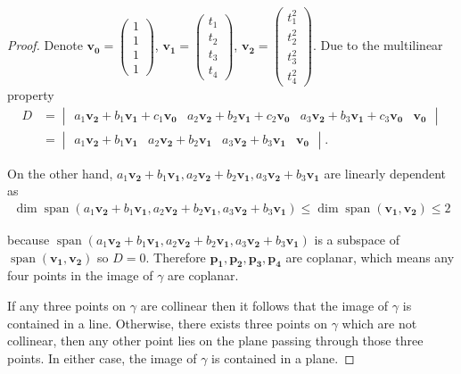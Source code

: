 \begin{proof}
	Denote $\mathbf{v_{0}} = \begin{pmatrix}1 \\ 1 \\ 1 \\ 1\end{pmatrix}$, $\mathbf{v_{1}} = \begin{pmatrix}t_{1} \\ t_{2} \\ t_{3} \\ t_{4}\end{pmatrix}$, $\mathbf{v_{2}} = \begin{pmatrix}t_{1}^{2} \\ t_{2}^{2} \\ t_{3}^{2} \\ t_{4}^{2}\end{pmatrix}$. Due to the multilinear property
	\begin{align*}
		D & = \begin{vmatrix}a_{1}\mathbf{v_{2}} + b_{1}\mathbf{v_{1}} + c_{1}\mathbf{v_{0}} & a_{2}\mathbf{v_{2}} + b_{2}\mathbf{v_{1}} + c_{2}\mathbf{v_{0}} & a_{3}\mathbf{v_{2}} + b_{3}\mathbf{v_{1}} + c_{3}\mathbf{v_{0}} & \mathbf{v_{0}}\end{vmatrix} \\
		  & = \begin{vmatrix}a_{1}\mathbf{v_{2}} + b_{1}\mathbf{v_{1}} & a_{2}\mathbf{v_{2}} + b_{2}\mathbf{v_{1}} & a_{3}\mathbf{v_{2}} + b_{3}\mathbf{v_{1}} & \mathbf{v_{0}}\end{vmatrix}.
	\end{align*}

	On the other hand, $a_{1}\mathbf{v_{2}} + b_{1}\mathbf{v_{1}}, a_{2}\mathbf{v_{2}} + b_{2}\mathbf{v_{1}}, a_{3}\mathbf{v_{2}} + b_{3}\mathbf{v_{1}}$ are linearly dependent as
	\begin{align*}
		\dim \operatorname{span}(a_{1}\mathbf{v_{2}} + b_{1}\mathbf{v_{1}}, a_{2}\mathbf{v_{2}} + b_{2}\mathbf{v_{1}}, a_{3}\mathbf{v_{2}} + b_{3}\mathbf{v_{1}}) \leq \dim\operatorname{span}(\mathbf{v_{1}}, \mathbf{v_{2}}) \leq 2
	\end{align*}

	because $\operatorname{span}(a_{1}\mathbf{v_{2}} + b_{1}\mathbf{v_{1}}, a_{2}\mathbf{v_{2}} + b_{2}\mathbf{v_{1}}, a_{3}\mathbf{v_{2}} + b_{3}\mathbf{v_{1}})$ is a subspace of $\operatorname{span}(\mathbf{v_{1}}, \mathbf{v_{2}})$ so $D = 0$. Therefore $\mathbf{p_{1}}, \mathbf{p_{2}}, \mathbf{p_{3}}, \mathbf{p_{4}}$ are coplanar, which means any four points in the image of $\gamma$ are coplanar.

	If any three points on $\gamma$ are collinear then it follows that the image of $\gamma$ is contained in a line. Otherwise, there exists three points on $\gamma$ which are not collinear, then any other point lies on the plane passing through those three points. In either case, the image of $\gamma$ is contained in a plane.
\end{proof}

